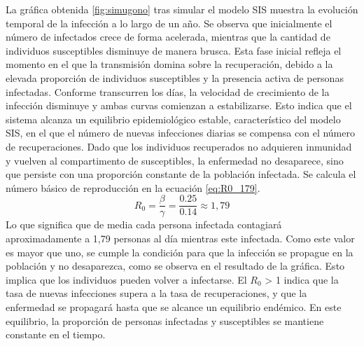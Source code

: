 La gráfica obtenida \ref{fig:simugono} tras simular el modelo SIS muestra la evolución temporal de la infección a lo largo de un año. Se observa que inicialmente el número de infectados crece de forma acelerada, mientras que la cantidad de individuos susceptibles disminuye de manera brusca. Esta fase inicial refleja el momento en el que la transmisión domina sobre la recuperación, debido a la elevada proporción de individuos susceptibles y la presencia activa de personas infectadas.
Conforme transcurren los días, la velocidad de crecimiento de la infección disminuye y ambas curvas comienzan a estabilizarse. Esto indica que el sistema alcanza un equilibrio epidemiológico estable, característico del modelo SIS, en el que el número de nuevas infecciones diarias se compensa con el número de recuperaciones. Dado que los individuos recuperados no adquieren inmunidad y vuelven al compartimento de susceptibles, la enfermedad no desaparece, sino que persiste con una proporción constante de la población infectada.
Se calcula el número básico de reproducción en la ecuación \eqref{eq:R0_179}.
\begin{equation}
R_0 = \frac{\beta}{\gamma} = \frac{0.25}{0.14} \approx 1{,}79
\label{eq:R0_179}
\end{equation}
Lo que significa que de media cada persona infectada contagiará aproximadamente a 1,79 personas al día mientras este infectada. Como este valor es mayor que uno, se cumple la condición para que la infección se propague en la población y no desaparezca, como se observa en el resultado de la gráfica. Esto implica que los individuos pueden volver a infectarse. El $R_0$ > 1 indica que la tasa de nuevas infecciones supera a la tasa de recuperaciones, y que la enfermedad se propagará hasta que se alcance un equilibrio endémico. En este equilibrio, la proporción de personas infectadas y susceptibles se mantiene constante en el tiempo.





